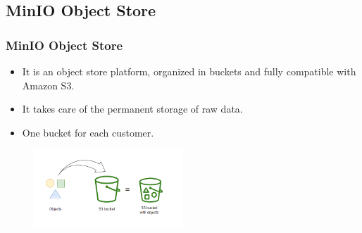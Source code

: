 \subsection{MinIO Object Store}
\begin{frame}
	\frametitle{MinIO Object Store}
	
	\begin{itemize}
		\item It is an object store platform, organized in buckets and fully compatible with Amazon S3.
		\item It takes care of the permanent storage of raw data.
		\item One bucket for each customer.
	\end{itemize}
	
	\begin{figure}[h]
		\centering
		\includegraphics[width=0.5\textwidth]{./img/buckets.png}
	\end{figure}
\end{frame}